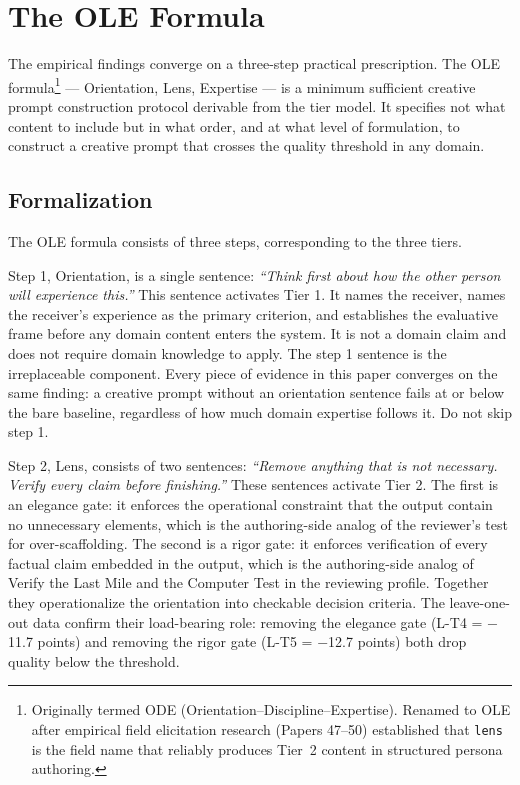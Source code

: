 \section{The OLE Formula}
\label{sec:ole}

The empirical findings converge on a three-step practical prescription. The OLE formula\footnote{Originally termed ODE (Orientation--Discipline--Expertise). Renamed to OLE after empirical field elicitation research (Papers 47--50) established that \texttt{lens} is the field name that reliably produces Tier~2 content in structured persona authoring.}
--- Orientation, Lens, Expertise --- is a minimum sufficient creative prompt
construction protocol derivable from the tier model. It specifies not what content to
include but in what order, and at what level of formulation, to construct a creative
prompt that crosses the quality threshold in any domain.

\subsection{Formalization}

The OLE formula consists of three steps, corresponding to the three tiers.

Step 1, Orientation, is a single sentence: \textit{``Think first about how the other
person will experience this.''} This sentence activates Tier 1. It names the receiver,
names the receiver's experience as the primary criterion, and establishes the evaluative
frame before any domain content enters the system. It is not a domain claim and does not
require domain knowledge to apply. The step 1 sentence is the irreplaceable component.
Every piece of evidence in this paper converges on the same finding: a creative prompt
without an orientation sentence fails at or below the bare baseline, regardless of how
much domain expertise follows it. Do not skip step 1.

Step 2, Lens, consists of two sentences: \textit{``Remove anything that is not
necessary. Verify every claim before finishing.''} These sentences activate Tier 2. The
first is an elegance gate: it enforces the operational constraint that the output contain
no unnecessary elements, which is the authoring-side analog of the reviewer's test for
over-scaffolding. The second is a rigor gate: it enforces verification of every factual
claim embedded in the output, which is the authoring-side analog of Verify the Last Mile
and the Computer Test in the reviewing profile. Together they operationalize the
orientation into checkable decision criteria. The leave-one-out data confirm their load-bearing
role: removing the elegance gate (L-T4 = $-$11.7 points) and removing the rigor gate
(L-T5 = $-$12.7 points) both drop quality below the threshold.

